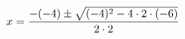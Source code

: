 \documentclass[preview]{standalone}
\begin{document}
\begin{align*}
x =  {-(-4) \pm \sqrt{ (-4)^2 - 4 \cdot 2 \cdot (-6) } \over 2 \cdot 2}
\end{align*}
\end{document}
